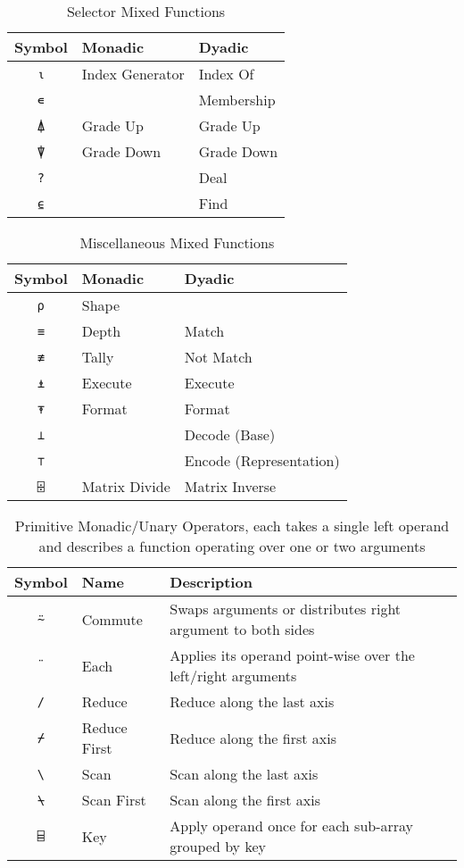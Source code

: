\documentclass[numbers,preprint]{sigplanconf}
\begin{document}
\begin{table}
\centering
\begin{tabular}{cll}
\toprule
Symbol     & Monadic         & Dyadic \\
\midrule
\texttt{⍳} & Index Generator & Index Of \\
\texttt{∊} &                 & Membership \\
\texttt{⍋} & Grade Up        & Grade Up \\
\texttt{⍒} & Grade Down      & Grade Down \\
\texttt{?} &                 & Deal \\
\texttt{⍷} &                 & Find \\
\end{tabular}
\caption{Selector Mixed Functions}
\label{tab:seltorprims}
\end{table}

\begin{table}
\centering
\begin{tabular}{cll}
\toprule
Symbol     & Monadic       & Dyadic \\
\midrule
\texttt{⍴} & Shape         & \\
\texttt{≡} & Depth         & Match \\
\texttt{≢} & Tally         & Not Match \\
\texttt{⍎} & Execute       & Execute \\
\texttt{⍕} & Format        & Format \\
\texttt{⊥} &               & Decode (Base) \\
\texttt{⊤} &               & Encode (Representation) \\
\texttt{⌹} & Matrix Divide & Matrix Inverse \\
\end{tabular}
\caption{Miscellaneous Mixed Functions}
\label{tab:miscprims}
\end{table}

\begin{table*}
\centering
\begin{tabular}{cll}
\toprule
Symbol     & Name & Description \\
\midrule
\texttt{⍨} & Commute & Swaps arguments or distributes
 right argument to both sides \\
\texttt{¨} & Each & Applies its operand point-wise over the left/right
 arguments \\
\texttt{/} & Reduce & Reduce along the last axis \\
\texttt{⌿} & Reduce First & Reduce along the first axis \\
\texttt{\textbackslash} & Scan & Scan along the last axis \\
\texttt{⍀} & Scan First & Scan along the first axis \\
\texttt{⌸} & Key & Apply operand once for each sub-array grouped by key \\
\end{tabular}
\caption{Primitive Monadic/Unary Operators, each takes a single left
operand and describes a function operating over one or two arguments}
\label{tab:adverbs}
\end{table*}
\end{document}
